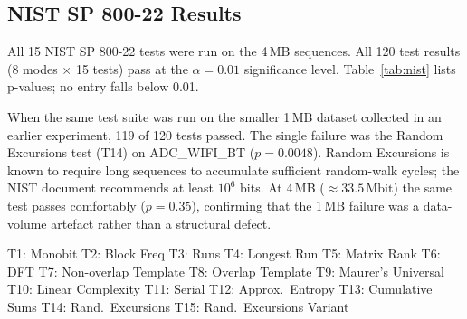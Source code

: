 \documentclass[10pt,twocolumn]{article}
\begin{document}
\subsection{NIST SP 800-22 Results}

All 15 NIST SP 800-22 tests were run on the 4\,MB sequences.
All 120 test results (8 modes $\times$ 15 tests) pass at the
$\alpha = 0.01$ significance level.
Table~\ref{tab:nist} lists p-values; no entry falls below 0.01.

When the same test suite was run on the smaller 1\,MB dataset collected
in an earlier experiment, 119 of 120 tests passed.
The single failure was the Random Excursions test (T14) on ADC\_WIFI\_BT
($p = 0.0048$).
Random Excursions is known to require long sequences to accumulate
sufficient random-walk cycles; the NIST document recommends at least
$10^6$ bits.
At 4\,MB ($\approx 33.5\,\text{Mbit}$) the same test passes comfortably
($p = 0.35$), confirming that the 1\,MB failure was a data-volume
artefact rather than a structural defect.

\begin{table}[h]
\centering
\caption{NIST SP 800-22 p-values on 4\,MB data ($p \geq 0.01$ = pass; all pass)}
\label{tab:nist}
\smallskip

\noindent\footnotesize
T1: Monobit \quad T2: Block Freq \quad T3: Runs \quad T4: Longest Run \quad
T5: Matrix Rank \quad T6: DFT \quad T7: Non-overlap Template \quad
T8: Overlap Template \quad T9: Maurer's Universal \quad
T10: Linear Complexity \quad T11: Serial \quad T12: Approx.\ Entropy \quad
T13: Cumulative Sums \quad T14: Rand.\ Excursions \quad T15: Rand.\ Excursions Variant
\end{table}
\end{document}
